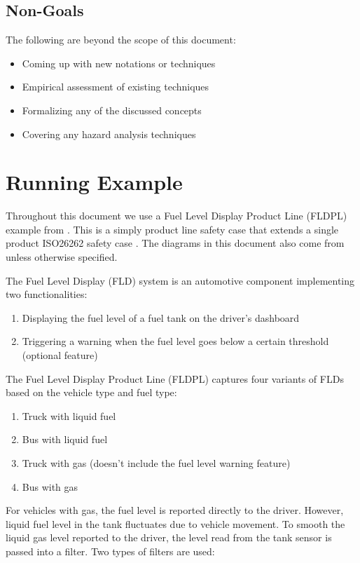 \documentclass[11pt]{article}
\begin{document}
\subsection{Non-Goals} 

The following are beyond the scope of this document:

\begin{itemize}
\item Coming up with new notations or techniques
\item Empirical assessment of existing techniques
\item Formalizing any of the discussed concepts
\item Covering any hazard analysis techniques
\end{itemize}

\section{Running Example}

Throughout this document we use a Fuel Level Display Product Line (FLDPL) example from \cite{Gallucci_2013}. This is a simply product line safety case that extends a single product ISO26262 safety case \cite{Dardar_2014}. The diagrams in this document also come from \cite{Gallucci_2013} unless otherwise specified.

The Fuel Level Display (FLD) system is an automotive component implementing two functionalities:

\begin{enumerate}
\item Displaying the fuel level of a fuel tank on the driver's dashboard
\item Triggering a warning when the fuel level goes below a certain threshold (optional feature)
\end{enumerate}

The Fuel Level Display Product Line (FLDPL) captures four variants of FLDs based on the vehicle type and fuel type:

\begin{enumerate}
\item Truck with liquid fuel
\item Bus with liquid fuel
\item Truck with gas (doesn't include the fuel level warning feature)
\item Bus with gas
\end{enumerate}

For vehicles with gas, the fuel level is reported directly to the driver. However, liquid fuel level in the tank fluctuates due to vehicle movement. To smooth the liquid gas level reported to the driver, the level read from the tank sensor is passed into a filter. Two types of filters are used:
\end{document}
